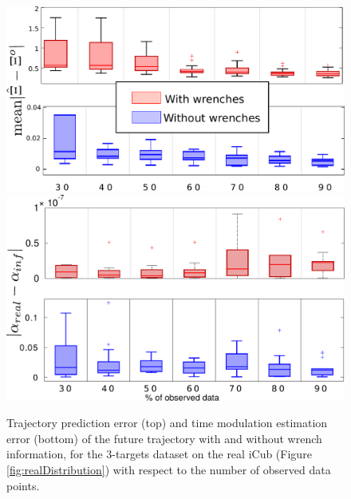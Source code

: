 \documentclass[utf8]{frontiersSCNS} %
\newcommand{\todo}[1]{\textcolor{red}{\textbf{/*#1*/}}}
\begin{document}
\begin{figure}[!h]
\centering
{
\includegraphics[width=12cm]{img/errBoxWithWithoutForces.pdf}\\
\includegraphics[width=12cm]{img/boxAlphaErrorWithForces.pdf}
}
\caption{Trajectory prediction error (top) and time modulation estimation error (bottom) of the future trajectory with and without wrench information, for the 3-targets dataset on the real iCub (Figure \ref{fig:realDistribution}) with respect to the number of observed data points.}
\label{fig:errBoxWithWithoutForces}
\end{figure}

\end{document}
